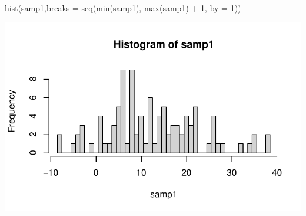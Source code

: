 \documentclass[
  letterpaper,
  DIV=11,
  numbers=noendperiod]{scrartcl}
\newenvironment{Shaded}{}{}
\newcommand{\AttributeTok}[1]{\textcolor[rgb]{0.84,0.60,0.13}{#1}}
\newcommand{\DecValTok}[1]{\textcolor[rgb]{0.96,0.45,0.00}{#1}}
\newcommand{\FunctionTok}[1]{\textcolor[rgb]{0.41,0.62,0.42}{#1}}
\newcommand{\NormalTok}[1]{\textcolor[rgb]{0.24,0.22,0.21}{#1}}
\newcommand{\SpecialCharTok}[1]{\textcolor[rgb]{0.69,0.38,0.53}{#1}}
\begin{document}
\begin{Shaded}
\begin{Highlighting}[]
\FunctionTok{hist}\NormalTok{(samp1,}\AttributeTok{breaks =} \FunctionTok{seq}\NormalTok{(}\FunctionTok{min}\NormalTok{(samp1), }\FunctionTok{max}\NormalTok{(samp1) }\SpecialCharTok{+} \DecValTok{1}\NormalTok{, }\AttributeTok{by =} \DecValTok{1}\NormalTok{))}
\end{Highlighting}
\end{Shaded}

\includegraphics{CervantesAlvarez_Brian_HW0_ST551_files/figure-pdf/unnamed-chunk-4-2.pdf}
\end{document}
